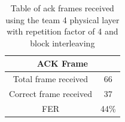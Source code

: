 \begin{table}[ht]
	\centering
		\begin{tabular}{| c | c | }
		\hline
			\multicolumn{2}{|c|}{ACK Frame}\\ 
		\hline                       
			 Total frame received & 66\\
			 Correct frame received& 37\\
		\hline
			FER & 44\%\\
		\hline
		\end{tabular}
	\caption{Table of ack frames received using the team 4 physical layer with repetition factor of 4 and block interleaving}
	\label{tab:team4ack}
	\end{table}
